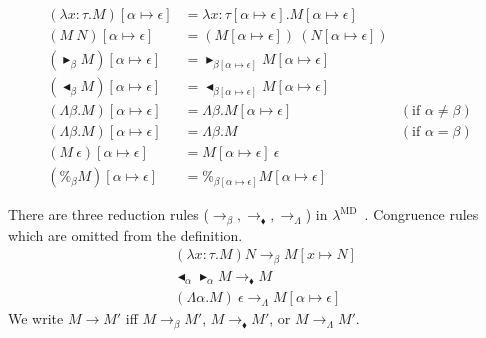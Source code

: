 \documentclass[runningheads]{llncs}
\newcommand{\LMD}{$\lambda^{\textrm{MD}}$\ }
\newcommand{\TB}{\blacktriangleright}
\newcommand{\TBL}{\blacktriangleleft}
\begin{document}
\begin{align*}
    (\lambda x:\tau.M)[\alpha \mapsto \epsilon] & = \lambda x:\tau[\alpha \mapsto \epsilon].M[\alpha \mapsto \epsilon]                                  \\
    (M\ N)[\alpha \mapsto \epsilon]             & = (M[\alpha \mapsto \epsilon])\ (N[\alpha \mapsto \epsilon])                                          \\
    (\TB_\beta M)[\alpha \mapsto \epsilon]      & = \TB_{\beta[\alpha \mapsto \epsilon]} M[\alpha \mapsto \epsilon]                                     \\
    (\TBL_\beta M)[\alpha \mapsto \epsilon]     & = \TBL_{\beta[\alpha \mapsto \epsilon]} M[\alpha \mapsto \epsilon]                                    \\
    (\Lambda\beta.M)[\alpha \mapsto \epsilon]   & = \Lambda\beta.M[\alpha \mapsto \epsilon]                            & (\text{if } \alpha \neq \beta) \\
    (\Lambda\beta.M)[\alpha \mapsto \epsilon]   & = \Lambda\beta.M                                                     & (\text{if } \alpha = \beta)    \\
    (M\ \epsilon)[\alpha \mapsto \epsilon]      & = M[\alpha \mapsto \epsilon]\ \epsilon                                                                \\
    (\%_\beta M)[\alpha \mapsto \epsilon]       & = \%_{\beta[\alpha \mapsto \epsilon]}M[\alpha \mapsto \epsilon] 
\end{align*}

\begin{definition}[Reduction]
    There are three reduction rules ($\longrightarrow_\beta, \longrightarrow_\blacklozenge, \longrightarrow_\Lambda$) in \LMD.
    Congruence rules which are omitted from the definition.
    \begin{align*}
         & (\lambda x:\tau.M) N \longrightarrow_\beta M[x \mapsto N]                       \\
         & \TBL_\alpha \TB_\alpha M \longrightarrow_\blacklozenge M                        \\
         & (\Lambda \alpha.M)\ \epsilon \longrightarrow_\Lambda M[\alpha \mapsto \epsilon]
    \end{align*}
    We write $ M \longrightarrow M'$ iff $ M \longrightarrow_\beta M'$, $ M \longrightarrow_\blacklozenge M'$, or $ M \longrightarrow_\Lambda M'$.
\end{definition}
\end{document}
